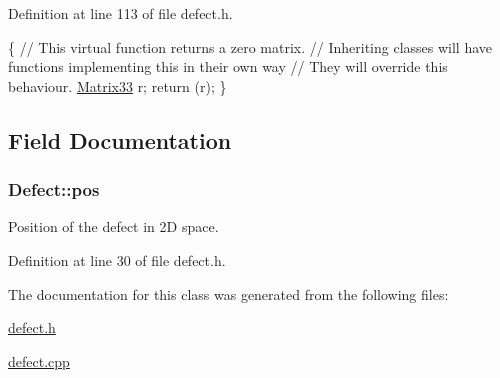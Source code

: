 Definition at line 113 of file defect.\-h.


\begin{DoxyCode}
  \{
    \textcolor{comment}{// This virtual function returns a zero matrix.}
    \textcolor{comment}{// Inheriting classes will have functions implementing this in their own
       way}
    \textcolor{comment}{// They will override this behaviour.}
    \hyperlink{classMatrix33}{Matrix33} r;
    \textcolor{keywordflow}{return} (r);
  \}
\end{DoxyCode}


\subsection{Field Documentation}
\hypertarget{classDefect_aed2731c1beefc22e3db6ad5b18194cdd}{
\subsubsection[{pos}]{ Defect\-::pos\hspace{0.3cm}{\ttfamily [protected]}}}\label{d5/d4f/classDefect_aed2731c1beefc22e3db6ad5b18194cdd}
Position of the defect in 2\-D space. 

Definition at line 30 of file defect.\-h.



The documentation for this class was generated from the following files\-:\begin{DoxyCompactItemize}
\item 
\hyperlink{defect_8h}{defect.\-h}\item 
\hyperlink{defect_8cpp}{defect.\-cpp}\end{DoxyCompactItemize}
